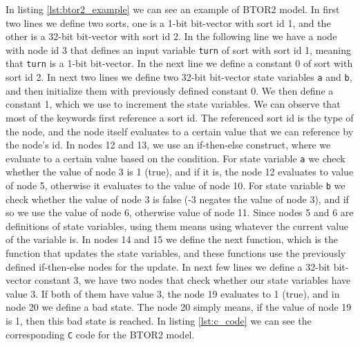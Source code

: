 \documentclass[12pt]{article}
\begin{document}
In listing \ref{lst:btor2_example} we can see an example of BTOR2 model. In 
first two lines we define two sorts, one is a 1-bit bit-vector with sort id 1,
and the other is a 32-bit bit-vector with sort id 2. In the following line we
have a node with node id 3 that defines an input variable \texttt{turn} of sort
with sort id 1, meaning that \texttt{turn} is a 1-bit bit-vector. In the next
line we define a constant 0 of sort with sort id 2. In next two lines we define
two 32-bit bit-vector state variables \texttt{a} and \texttt{b}, and then 
initialize them with previously defined constant 0. We then define a constant 1,
which we use to increment the state variables. We can observe that most of the
keywords first reference a sort id. The referenced sort id is the type of the
node, and the node itself evaluates to a certain value that we can reference by
the node's id. In nodes 12 and 13, we use an if-then-else construct, where we
evaluate to a certain value based on the condition. For state variable
\texttt{a} we check whether the value of node 3 is 1 (true), and if it is, the
node 12 evaluates to value of node 5, otherwise it evaluates to the value of
node 10. For state variable \texttt{b} we check whether the value of node 3 is
false (-3 negates the value of node 3), and if so we use the value of node 6,
otherwise value of node 11. Since nodes 5 and 6 are definitions of state
variables, using them means using whatever the current value of the variable
is. In nodes 14 and 15 we define the next function, which is the function that
updates the state variables, and these functions use the previously defined 
if-then-else nodes for the update. In next few lines we define a 32-bit
bit-vector constant 3, we have two nodes that check whether our state variables
have value 3. If both of them have value 3, the node 19 evaluates to 1 (true),
and in node 20 we define a bad state. The node 20 simply means, if the value of
node 19 is 1, then this bad state is reached. In listing \ref{lst:c_code} we 
can see the corresponding \texttt{C} code for the BTOR2 model.
\end{document}
